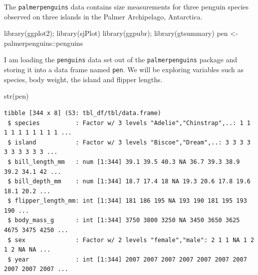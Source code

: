 \documentclass[
  letterpaper,
  DIV=11,
  numbers=noendperiod,
  oneside]{scrreprt}
\newenvironment{Shaded}{\begin{snugshade}}{\end{snugshade}}
\newcommand{\FunctionTok}[1]{\textcolor[rgb]{0.28,0.35,0.67}{#1}}
\newcommand{\NormalTok}[1]{\textcolor[rgb]{0.00,0.23,0.31}{#1}}
\newcommand{\OtherTok}[1]{\textcolor[rgb]{0.00,0.23,0.31}{#1}}
\newcommand{\SpecialCharTok}[1]{\textcolor[rgb]{0.37,0.37,0.37}{#1}}
\begin{document}
\begin{tcolorbox}[enhanced jigsaw, bottomrule=.15mm, colback=white, colframe=quarto-callout-note-color-frame, toprule=.15mm, coltitle=black, rightrule=.15mm, opacitybacktitle=0.6, colbacktitle=quarto-callout-note-color!10!white, toptitle=1mm, leftrule=.75mm, breakable, bottomtitle=1mm, titlerule=0mm, title={Meet the Penguins}, arc=.35mm, left=2mm, opacityback=0]

The \texttt{palmerpenguins} data contains size measurements for three
penguin species observed on three islands in the Palmer Archipelago,
Antarctica. {}

\begin{Shaded}
\begin{Highlighting}[]
\FunctionTok{library}\NormalTok{(ggplot2); }\FunctionTok{library}\NormalTok{(sjPlot)    }
\FunctionTok{library}\NormalTok{(ggpubr);  }\FunctionTok{library}\NormalTok{(gtsummary)}
\NormalTok{pen }\OtherTok{\textless{}{-}}\NormalTok{ palmerpenguins}\SpecialCharTok{::}\NormalTok{penguins}
\end{Highlighting}
\end{Shaded}

\end{tcolorbox}

I am loading the \texttt{penguins} data set out of the
\texttt{palmerpenguins} package and storing it into a data frame named
\texttt{pen}. We will be exploring variables such as species, body
weight, the island and flipper lengths.

\begin{Shaded}
\begin{Highlighting}[]
\FunctionTok{str}\NormalTok{(pen)}
\end{Highlighting}
\end{Shaded}

\begin{verbatim}
tibble [344 x 8] (S3: tbl_df/tbl/data.frame)
 $ species          : Factor w/ 3 levels "Adelie","Chinstrap",..: 1 1 1 1 1 1 1 1 1 1 ...
 $ island           : Factor w/ 3 levels "Biscoe","Dream",..: 3 3 3 3 3 3 3 3 3 3 ...
 $ bill_length_mm   : num [1:344] 39.1 39.5 40.3 NA 36.7 39.3 38.9 39.2 34.1 42 ...
 $ bill_depth_mm    : num [1:344] 18.7 17.4 18 NA 19.3 20.6 17.8 19.6 18.1 20.2 ...
 $ flipper_length_mm: int [1:344] 181 186 195 NA 193 190 181 195 193 190 ...
 $ body_mass_g      : int [1:344] 3750 3800 3250 NA 3450 3650 3625 4675 3475 4250 ...
 $ sex              : Factor w/ 2 levels "female","male": 2 1 1 NA 1 2 1 2 NA NA ...
 $ year             : int [1:344] 2007 2007 2007 2007 2007 2007 2007 2007 2007 2007 ...
\end{verbatim}
\end{document}
